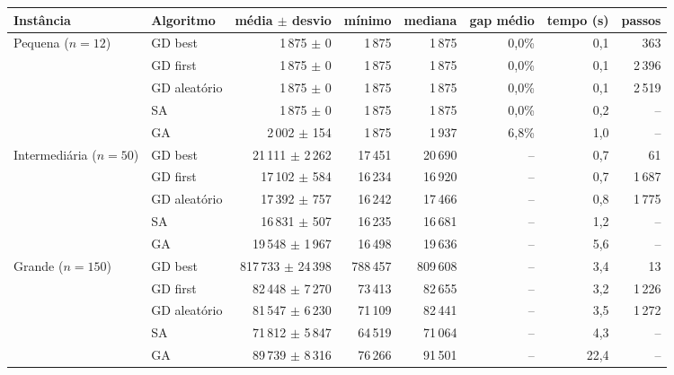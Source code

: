 \begin{tabular}{llrrrrrr}
\toprule
Instância & Algoritmo & média $\pm$ desvio & mínimo & mediana & gap médio & tempo (s) & passos \\
\midrule
Pequena ($n=12$) & GD best & 1\,875 $\pm$ 0 & 1\,875 & 1\,875 & 0,0\% & 0,1 & 363 \\
 & GD first & 1\,875 $\pm$ 0 & 1\,875 & 1\,875 & 0,0\% & 0,1 & 2\,396 \\
 & GD aleatório & 1\,875 $\pm$ 0 & 1\,875 & 1\,875 & 0,0\% & 0,1 & 2\,519 \\
 & SA & 1\,875 $\pm$ 0 & 1\,875 & 1\,875 & 0,0\% & 0,2 & -- \\
 & GA & 2\,002 $\pm$ 154 & 1\,875 & 1\,937 & 6,8\% & 1,0 & -- \\
\midrule
Intermediária ($n=50$) & GD best & 21\,111 $\pm$ 2\,262 & 17\,451 & 20\,690 & -- & 0,7 & 61 \\
 & GD first & 17\,102 $\pm$ 584 & 16\,234 & 16\,920 & -- & 0,7 & 1\,687 \\
 & GD aleatório & 17\,392 $\pm$ 757 & 16\,242 & 17\,466 & -- & 0,8 & 1\,775 \\
 & SA & 16\,831 $\pm$ 507 & 16\,235 & 16\,681 & -- & 1,2 & -- \\
 & GA & 19\,548 $\pm$ 1\,967 & 16\,498 & 19\,636 & -- & 5,6 & -- \\
\midrule
Grande ($n=150$) & GD best & 817\,733 $\pm$ 24\,398 & 788\,457 & 809\,608 & -- & 3,4 & 13 \\
 & GD first & 82\,448 $\pm$ 7\,270 & 73\,413 & 82\,655 & -- & 3,2 & 1\,226 \\
 & GD aleatório & 81\,547 $\pm$ 6\,230 & 71\,109 & 82\,441 & -- & 3,5 & 1\,272 \\
 & SA & 71\,812 $\pm$ 5\,847 & 64\,519 & 71\,064 & -- & 4,3 & -- \\
 & GA & 89\,739 $\pm$ 8\,316 & 76\,266 & 91\,501 & -- & 22,4 & -- \\
\bottomrule
\end{tabular}
